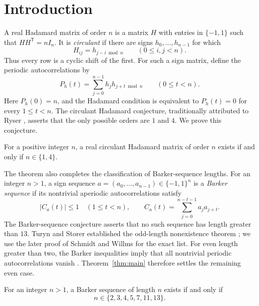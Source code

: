 \section{Introduction}

A real Hadamard matrix of order \(n\) is a matrix \(H\) with entries
in \(\{-1,1\}\) such that \(HH^{\mathsf T}=nI_n\). It is
\emph{circulant} if there are signs \(h_0,\ldots,h_{n-1}\) for which
\[
 H_{ij}=h_{j-i\bmod n}\qquad(0\leq i,j<n).
\]
Thus every row is a cyclic shift of the first. For such a sign matrix,
define the periodic autocorrelations by
\[
 P_h(t)=\sum_{j=0}^{n-1}h_jh_{j+t\bmod n}
 \qquad(0\leq t<n).
\]
Here \(P_h(0)=n\), and the Hadamard condition is equivalent to
\(P_h(t)=0\) for every \(1\leq t<n\).
The circulant Hadamard conjecture, traditionally attributed to Ryser
\cite{Ryser1963,LeungSchmidt2012}, asserts that the only possible
orders are \(1\) and \(4\). We prove this conjecture.

\begin{theorem}\label{thm:main}
For a positive integer \(n\), a real circulant Hadamard matrix of
order \(n\) exists if and only if \(n\in\{1,4\}\).
\end{theorem}

The theorem also completes the classification of Barker-sequence
lengths. For an integer \(n>1\), a sign sequence
\(a=(a_0,\ldots,a_{n-1})\in\{-1,1\}^n\) is a \emph{Barker sequence}
if its nontrivial aperiodic autocorrelations satisfy
\[
 |C_a(t)|\leq1\quad(1\leq t<n),\qquad
 C_a(t)=\sum_{j=0}^{n-t-1}a_ja_{j+t}.
\]
The Barker-sequence conjecture asserts that no such sequence has
length greater than \(13\). Turyn and Storer established the odd-length
nonexistence theorem \cite{TurynStorer1961}; we use the later proof of
Schmidt and Willms \cite{SchmidtWillms2016} for the exact list.
For even length greater
than two, the Barker inequalities imply that all nontrivial periodic
autocorrelations vanish \cite{TurynStorer1961,Turyn1965}.
Theorem~\ref{thm:main} therefore settles the remaining even case.

\begin{corollary}\label{cor:barker}
For an integer \(n>1\), a Barker sequence of length \(n\) exists if
and only if
\[
 n\in\{2,3,4,5,7,11,13\}.
\]
\end{corollary}
